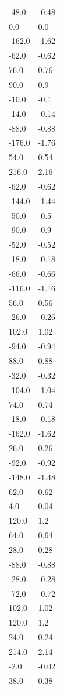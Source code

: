 \begin{longtable}{ll}
-48.0 & -0.48 \\
0.0 & 0.0 \\
-162.0 & -1.62 \\
-62.0 & -0.62 \\
76.0 & 0.76 \\
90.0 & 0.9 \\
-10.0 & -0.1 \\
-14.0 & -0.14 \\
-88.0 & -0.88 \\
-176.0 & -1.76 \\
54.0 & 0.54 \\
216.0 & 2.16 \\
-62.0 & -0.62 \\
-144.0 & -1.44 \\
-50.0 & -0.5 \\
-90.0 & -0.9 \\
-52.0 & -0.52 \\
-18.0 & -0.18 \\
-66.0 & -0.66 \\
-116.0 & -1.16 \\
56.0 & 0.56 \\
-26.0 & -0.26 \\
102.0 & 1.02 \\
-94.0 & -0.94 \\
88.0 & 0.88 \\
-32.0 & -0.32 \\
-104.0 & -1.04 \\
74.0 & 0.74 \\
-18.0 & -0.18 \\
-162.0 & -1.62 \\
26.0 & 0.26 \\
-92.0 & -0.92 \\
-148.0 & -1.48 \\
62.0 & 0.62 \\
4.0 & 0.04 \\
120.0 & 1.2 \\
64.0 & 0.64 \\
28.0 & 0.28 \\
-88.0 & -0.88 \\
-28.0 & -0.28 \\
-72.0 & -0.72 \\
102.0 & 1.02 \\
120.0 & 1.2 \\
24.0 & 0.24 \\
214.0 & 2.14 \\
-2.0 & -0.02 \\
38.0 & 0.38 \\

\end{longtable}
